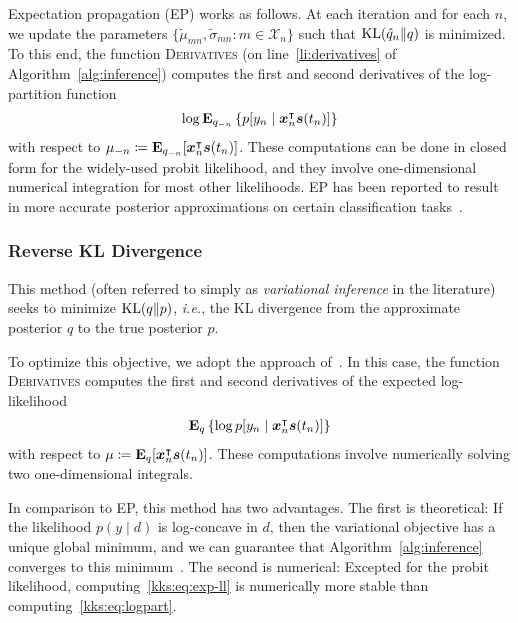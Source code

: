 Expectation propagation (EP) works as follows. At each iteration and for each $n$, we update the parameters $\{ \tilde{\mu}_{mn}, \tilde{\sigma}_{mn} : m \in \mathcal{X}_n \}$ such that $\mathrm{KL}( \hat{q}_n \Vert q )$ is minimized.
To this end, the function \textsc{Derivatives} (on line~\ref{li:derivatives} of Algorithm~\ref{alg:inference}) computes the first and second derivatives of the log-partition function
\begin{align}
	\label{kks:eq:logpart}
	\log \mathbf{E}_{q_{-n}} \left\{ p[y_n \mid \bm{x}_n^\intercal \bm{s}(t_n)] \right\}
\end{align}
with respect to ${\mu}_{-n} \coloneqq \mathbf{E}_{q_{-n}}[\bm{x}_n^\intercal \bm{s}(t_n)]$.
These computations can be done in closed form for the widely-used probit likelihood, and they involve one-dimensional numerical integration for most other likelihoods.
EP has been reported to result in more accurate posterior approximations on certain classification tasks~\citep{nickisch2008approximations}.

\subsubsection{Reverse KL Divergence}

This method (often referred to simply as \emph{variational inference} in the literature) seeks to minimize $\mathrm{KL}(q \Vert p)$, \textit{i.e.}, the KL divergence from the approximate posterior $q$ to the true posterior $p$.

To optimize this objective, we adopt the approach of~\citet{khan2017conjugate}.
In this case, the function \textsc{Derivatives} computes the first and second derivatives of the expected log-likelihood
\begin{align}
	\label{kks:eq:exp-ll}
	\mathbf{E}_q \left\{ \log p[y_n \mid \bm{x}_n^\intercal \bm{s}(t_n)] \right\}
\end{align}
with respect to $\mu \coloneqq \mathbf{E}_q[\bm{x}_n^\intercal \bm{s}(t_n)]$.
These computations involve numerically solving two one-dimensional integrals.

In comparison to EP, this method has two advantages.
The first is theoretical:
If the likelihood $p(y \mid d)$ is log-concave in $d$, then the variational objective has a unique global minimum, and we can guarantee that Algorithm~\ref{alg:inference} converges to this minimum~\citep{khan2017conjugate}.
The second is numerical:
Excepted for the probit likelihood, computing~\eqref{kks:eq:exp-ll} is numerically more stable than computing~\eqref{kks:eq:logpart}.



